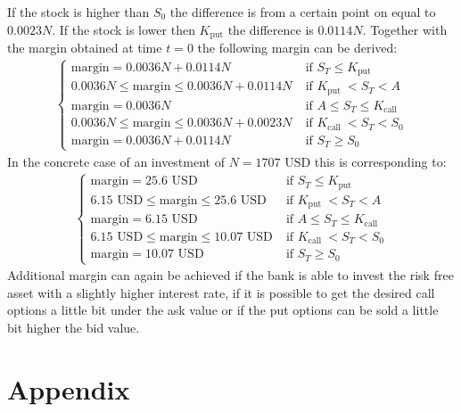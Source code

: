 \documentclass[11pt,oneside,a4paper]{article}
\makeatletter
\def\cleardoublepage{\clearpage\if@twoside \ifodd\c@page\else%
	\hbox{}%
	\thispagestyle{empty}%
	\clearpage%
	\if@twocolumn\hbox{}\clearpage\fi\fi\fi}
\makeatother
\begin{document}
	If the stock is higher than $ S_0 $ the difference is from a certain point on equal to $ 0.0023N $. If the stock is lower then $ K_{\text{put}} $ the difference is $ 0.0114N $. 
	Together with the margin obtained at time $ t=0 $ the following margin can be derived:
	\begin{align*}
		 \begin{cases}
		 \text{margin} = 0.0036N + 0.0114N \; &\text{if } S_T \leq K_\text{put} \\
		  0.0036N \leq \text{margin} \leq 0.0036N + 0.0114N  \; &\text{if } K_\text{put }<S_T < A \\
		   \text{margin} = 0.0036N  \; &\text{if } A \leq S_T \leq K_\text{call} \\
		   0.0036N \leq \text{margin} \leq 0.0036N + 0.0023N  \; &\text{if } K_\text{call }<S_T < S_0 \\
		 \text{margin} = 0.0036N + 0.0114N \; &\text{if } S_T \geq S_0
		 \end{cases}
	\end{align*}
	In the concrete case of an investment of $ N = 1707 \text{ USD} $ this is corresponding to:
	\begin{align*}
	\begin{cases}
	\text{margin} = 25.6 \text{ USD} \; &\text{if } S_T \leq K_\text{put} \\
	6.15 \text{ USD} \leq \text{margin} \leq 25.6 \text{ USD}  \; &\text{if } K_\text{put }<S_T < A \\
	\text{margin} = 6.15 \text{ USD}  \; &\text{if } A \leq S_T \leq K_\text{call} \\
	6.15 \text{ USD} \leq \text{margin} \leq 10.07 \text{ USD}  \; &\text{if } K_\text{call }<S_T < S_0 \\
	\text{margin} =  10.07 \text{ USD} \; &\text{if } S_T \geq S_0
	\end{cases}
	\end{align*}
	Additional margin can again be achieved if the bank is able to invest the risk free asset with a slightly higher interest rate, if it is possible to get the desired call options a little bit under the ask value or if the put options can be sold a little bit higher the bid value.
	
	
	
	\cleardoublepage
	\section{Appendix}
\end{document}
